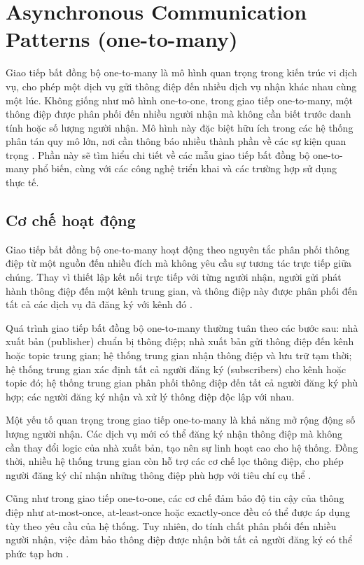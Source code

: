 \section{Asynchronous Communication Patterns (one-to-many)}
Giao tiếp bất đồng bộ one-to-many là mô hình quan trọng trong kiến trúc vi dịch vụ, cho phép một dịch vụ gửi thông điệp đến nhiều dịch vụ nhận khác nhau cùng một lúc. Không giống như mô hình one-to-one, trong giao tiếp one-to-many, một thông điệp được phân phối đến nhiều người nhận mà không cần biết trước danh tính hoặc số lượng người nhận. Mô hình này đặc biệt hữu ích trong các hệ thống phân tán quy mô lớn, nơi cần thông báo nhiều thành phần về các sự kiện quan trọng \cite{newman2015}. Phần này sẽ tìm hiểu chi tiết về các mẫu giao tiếp bất đồng bộ one-to-many phổ biến, cùng với các công nghệ triển khai và các trường hợp sử dụng thực tế.
\subsection{Cơ chế hoạt động}
Giao tiếp bất đồng bộ one-to-many hoạt động theo nguyên tắc phân phối thông điệp từ một nguồn đến nhiều đích mà không yêu cầu sự tương tác trực tiếp giữa chúng. Thay vì thiết lập kết nối trực tiếp với từng người nhận, người gửi phát hành thông điệp đến một kênh trung gian, và thông điệp này được phân phối đến tất cả các dịch vụ đã đăng ký với kênh đó \cite{hohpe2004}.

Quá trình giao tiếp bất đồng bộ one-to-many thường tuân theo các bước sau: nhà xuất bản (publisher) chuẩn bị thông điệp; nhà xuất bản gửi thông điệp đến kênh hoặc topic trung gian; hệ thống trung gian nhận thông điệp và lưu trữ tạm thời; hệ thống trung gian xác định tất cả người đăng ký (subscribers) cho kênh hoặc topic đó; hệ thống trung gian phân phối thông điệp đến tất cả người đăng ký phù hợp; các người đăng ký nhận và xử lý thông điệp độc lập với nhau.

Một yếu tố quan trọng trong giao tiếp one-to-many là khả năng mở rộng động số lượng người nhận. Các dịch vụ mới có thể đăng ký nhận thông điệp mà không cần thay đổi logic của nhà xuất bản, tạo nên sự linh hoạt cao cho hệ thống. Đồng thời, nhiều hệ thống trung gian còn hỗ trợ các cơ chế lọc thông điệp, cho phép người đăng ký chỉ nhận những thông điệp phù hợp với tiêu chí cụ thể \cite{richardson2019}.

Cũng như trong giao tiếp one-to-one, các cơ chế đảm bảo độ tin cậy của thông điệp như at-most-once, at-least-once hoặc exactly-once đều có thể được áp dụng tùy theo yêu cầu của hệ thống. Tuy nhiên, do tính chất phân phối đến nhiều người nhận, việc đảm bảo thông điệp được nhận bởi tất cả người đăng ký có thể phức tạp hơn \cite{aksakalli2021}.

